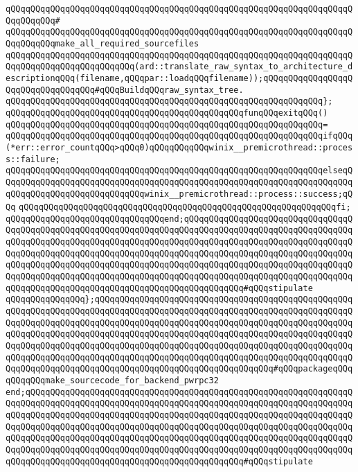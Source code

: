 \verb|qQQqqQQqqQQqqQQqqQQqqQQqqQQqqQQqqQQqqQQqqQQqqQQqqQQqqQQqqQQqqQQqqQQqqQQqqQQqqQQq#|\newline
\verb|qQQqqQQqqQQqqQQqqQQqqQQqqQQqqQQqqQQqqQQqqQQqqQQqqQQqqQQqqQQqqQQqqQQqqQQqqQQqqQQqmake_all_required_sourcefiles|\newline
\verb|qQQqqQQqqQQqqQQqqQQqqQQqqQQqqQQqqQQqqQQqqQQqqQQqqQQqqQQqqQQqqQQqqQQqqQQqqQQqqQQqqQQqqQQqqQQqqQQq(ard::translate_raw_syntax_to_architecture_descriptionqQQq(filename,qQQqpar::loadqQQqfilename));qQQqqQQqqQQqqQQqqQQqqQQqqQQqqQQqqQQq#qQQqBuildqQQqraw_syntax_tree.|\newline
\verb|qQQqqQQqqQQqqQQqqQQqqQQqqQQqqQQqqQQqqQQqqQQqqQQqqQQqqQQqqQQqqQQq};|\newline
\newline
\verb|qQQqqQQqqQQqqQQqqQQqqQQqqQQqqQQqqQQqqQQqqQQqqQQqfunqQQqexitqQQq()|\newline
\verb|qQQqqQQqqQQqqQQqqQQqqQQqqQQqqQQqqQQqqQQqqQQqqQQqqQQqqQQqqQQqqQQq=|\newline
\verb|qQQqqQQqqQQqqQQqqQQqqQQqqQQqqQQqqQQqqQQqqQQqqQQqqQQqqQQqqQQqqQQqifqQQq(*err::error_countqQQq>qQQq0)qQQqqQQqqQQqwinix__premicrothread::process::failure;|\newline
\verb|qQQqqQQqqQQqqQQqqQQqqQQqqQQqqQQqqQQqqQQqqQQqqQQqqQQqqQQqqQQqqQQqelseqQQqqQQqqQQqqQQqqQQqqQQqqQQqqQQqqQQqqQQqqQQqqQQqqQQqqQQqqQQqqQQqqQQqqQQqqQQqqQQqqQQqqQQqqQQqqQQqqQQqwinix__premicrothread::process::success;qQQq|\newline
\verb|qQQqqQQqqQQqqQQqqQQqqQQqqQQqqQQqqQQqqQQqqQQqqQQqqQQqqQQqqQQqqQQqfi;|\newline
\verb|qQQqqQQqqQQqqQQqqQQqqQQqqQQqqQQqend;qQQqqQQqqQQqqQQqqQQqqQQqqQQqqQQqqQQqqQQqqQQqqQQqqQQqqQQqqQQqqQQqqQQqqQQqqQQqqQQqqQQqqQQqqQQqqQQqqQQqqQQqqQQqqQQqqQQqqQQqqQQqqQQqqQQqqQQqqQQqqQQqqQQqqQQqqQQqqQQqqQQqqQQqqQQqqQQqqQQqqQQqqQQqqQQqqQQqqQQqqQQqqQQqqQQqqQQqqQQqqQQqqQQqqQQqqQQqqQQqqQQqqQQqqQQqqQQqqQQqqQQqqQQqqQQqqQQqqQQqqQQqqQQqqQQqqQQqqQQqqQQqqQQqqQQqqQQqqQQqqQQqqQQqqQQqqQQqqQQqqQQqqQQqqQQqqQQqqQQqqQQqqQQqqQQqqQQqqQQqqQQqqQQqqQQqqQQqqQQqqQQqqQQqqQQqqQQqqQQqqQQqqQQqqQQq#qQQqstipulate|\newline
\verb|qQQqqQQqqQQqqQQq};qQQqqQQqqQQqqQQqqQQqqQQqqQQqqQQqqQQqqQQqqQQqqQQqqQQqqQQqqQQqqQQqqQQqqQQqqQQqqQQqqQQqqQQqqQQqqQQqqQQqqQQqqQQqqQQqqQQqqQQqqQQqqQQqqQQqqQQqqQQqqQQqqQQqqQQqqQQqqQQqqQQqqQQqqQQqqQQqqQQqqQQqqQQqqQQqqQQqqQQqqQQqqQQqqQQqqQQqqQQqqQQqqQQqqQQqqQQqqQQqqQQqqQQqqQQqqQQqqQQqqQQqqQQqqQQqqQQqqQQqqQQqqQQqqQQqqQQqqQQqqQQqqQQqqQQqqQQqqQQqqQQqqQQqqQQqqQQqqQQqqQQqqQQqqQQqqQQqqQQqqQQqqQQqqQQqqQQqqQQqqQQqqQQqqQQqqQQqqQQqqQQqqQQqqQQqqQQqqQQqqQQqqQQqqQQqqQQqqQQqqQQqqQQqqQQqqQQq#qQQqpackageqQQqqQQqqQQqmake_sourcecode_for_backend_pwrpc32|\newline
\verb|end;qQQqqQQqqQQqqQQqqQQqqQQqqQQqqQQqqQQqqQQqqQQqqQQqqQQqqQQqqQQqqQQqqQQqqQQqqQQqqQQqqQQqqQQqqQQqqQQqqQQqqQQqqQQqqQQqqQQqqQQqqQQqqQQqqQQqqQQqqQQqqQQqqQQqqQQqqQQqqQQqqQQqqQQqqQQqqQQqqQQqqQQqqQQqqQQqqQQqqQQqqQQqqQQqqQQqqQQqqQQqqQQqqQQqqQQqqQQqqQQqqQQqqQQqqQQqqQQqqQQqqQQqqQQqqQQqqQQqqQQqqQQqqQQqqQQqqQQqqQQqqQQqqQQqqQQqqQQqqQQqqQQqqQQqqQQqqQQqqQQqqQQqqQQqqQQqqQQqqQQqqQQqqQQqqQQqqQQqqQQqqQQqqQQqqQQqqQQqqQQqqQQqqQQqqQQqqQQqqQQqqQQqqQQqqQQqqQQqqQQqqQQqqQQqqQQqqQQqqQQqqQQq#qQQqstipulate|\newline

